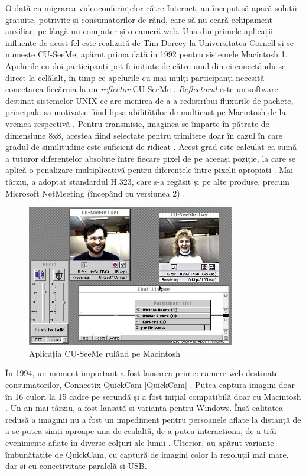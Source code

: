 \indent \par O dată cu migrarea videoconferințelor către Internet, au început să apară soluții gratuite, potrivite și consumatorilor de rând, care să nu ceară echipament auxiliar, pe lângă un computer și o cameră web. Una din primele aplicații influente de acest fel este realizată de Tim Dorcey la Universitatea Cornell și se numește CU-SeeMe, apărut prima dată în 1992 pentru sistemele Macintosh \ref{CUSeeMeMac}. Apelurile cu doi participanți pot fi inițiate de către unul din ei conectându-se direct la celălalt, în timp ce apelurile cu mai mulți participanți necesită conectarea fiecăruia la un \textit{reflector} CU-SeeMe \cite{Dorcey95}. \textit{Reflectorul} este un software destinat sistemelor UNIX ce are menirea de a a redistribui fluxurile de pachete, principala sa motivație fiind lipsa abilităților de multicast pe Macintosh de la vremea respectivă \cite{Dorcey95}. Pentru transmisie, imaginea se împarte în pătrate de dimensiune 8x8, acestea fiind selectate pentru trimitere doar în cazul în care gradul de similitudine este suficient de ridicat \cite{Dorcey95}. Acest grad este calculat ca sumă a tuturor diferențelor absolute între fiecare pixel de pe aceeași poziție, la care se aplică o penalizare multiplicativă pentru diferențele între pixelii apropiați \cite{Dorcey95}. Mai târziu, a adoptat standardul H.323, care s-a regăsit și pe alte produse, precum Microsoft NetMeeting (începând cu versiunea 2) \cite{Vidconf, Perey2000}.
\begin{figure}[H]
    \centering
    \includegraphics[width=9.1cm]{figures/cu-seeme.jpg}
    \caption{Aplicația CU-SeeMe rulând pe Macintosh}
    \label{CUSeeMeMac}
\end{figure}
\indent \par În 1994, un moment important a fost lansarea primei camere web destinate consumatorilor, Connectix QuickCam \ref{QuickCam} \cite{Wolfe2019}. Putea captura imagini doar în 16 culori la 15 cadre pe secundă și a fost inițial compatibilă doar cu Macintosh \cite{Wolfe2019}. Un an mai târziu, a fost lansată și varianta pentru Windows. Însă calitatea redusă a imaginii nu a fost un impediment pentru persoanele aflate la distanță de a se putea simți aproape una de cealaltă, de a putea interacționa, de a trăi evenimente aflate în diverse colțuri ale lumii \cite{QuickCam94}. Ulterior, au apărut variante îmbunătațite de QuickCam, cu captură de imagini color la rezoluții mai mare, dar și cu conectivitate paralelă și USB.
